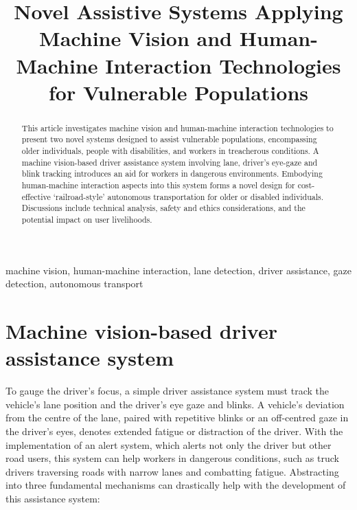 \documentclass[9pt,conference]{IEEEtran}
\begin{document}
\title{Novel Assistive Systems Applying Machine Vision and Human-Machine Interaction Technologies for Vulnerable Populations}

\author{
}

\maketitle

\begin{abstract}
    This article investigates machine vision and human-machine interaction technologies to present two novel systems designed to assist vulnerable populations, encompassing older individuals, people with disabilities, and workers in treacherous conditions. A machine vision-based driver assistance system involving lane, driver's eye-gaze and blink tracking introduces an aid for workers in dangerous environments. Embodying human-machine interaction aspects into this system forms a novel design for cost-effective `railroad-style' autonomous transportation for older or disabled individuals. Discussions include technical analysis, safety and ethics considerations, and the potential impact on user livelihoods.
\end{abstract}

\begin{IEEEkeywords}
machine vision, human-machine interaction, lane detection, driver assistance, gaze detection, autonomous transport
\end{IEEEkeywords}

\section{Machine vision-based driver assistance system}
To gauge the driver's focus, a simple driver assistance system must track the vehicle's lane position and the driver's eye gaze and blinks. A vehicle's deviation from the centre of the lane, paired with repetitive blinks or an off-centred gaze in the driver's eyes, denotes extended fatigue or distraction of the driver. With the implementation of an alert system, which alerts not only the driver but other road users, this system can help workers in dangerous conditions, such as truck drivers traversing roads with narrow lanes and combatting fatigue. Abstracting into three fundamental mechanisms can drastically help with the development of this assistance system:
\end{document}
